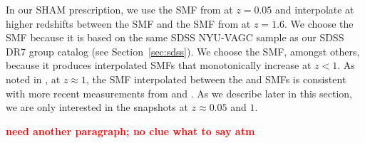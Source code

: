 \documentclass[12pt, letterpaper, preprint]{aastex}
\newcommand{\todo}[1]{{\bf \textcolor{red}{#1}}}
\begin{document}
In our SHAM prescription, we use the SMF from \cite{li2009} at $z = 0.05$ 
and interpolate at higher redshifts between the \cite{li2009} SMF and the 
SMF from \cite{marchesini2009} at $z = 1.6$. We choose the \cite{li2009} 
SMF because it is based on the same SDSS NYU-VAGC sample as our SDSS DR7 
group catalog (see Section~\ref{sec:sdss}). We choose the \cite{marchesini2009} 
SMF, amongst others, because it produces interpolated SMFs that monotonically 
increase at $z < 1$. As noted in \cite{hahn2017}, at $z \approx 1$, the 
SMF interpolated between the \cite{li2009} and \cite{marchesini2009} SMFs 
is consistent with more recent measurements from \cite{muzzin2013} and \cite{ilbert2013}. 
As we describe later in this section, we are only interested in the snapshots 
at $z \approx 0.05$ and $1$.

\todo{need another paragraph; no clue what to say atm} 


\end{document}
